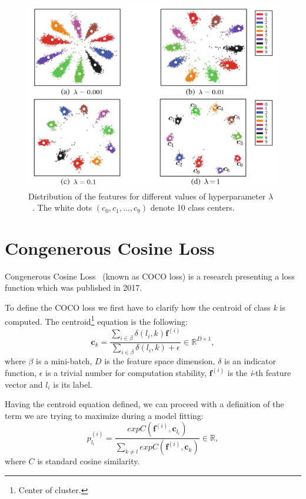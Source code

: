 \begin{figure}[H]
    \centering
    \includegraphics[width=\columnwidth]{images/face-recognition/centerlosslambda.png}
    \caption{Distribution of the features for different values of hyperparameter $\lambda$~\cite{CenterLoss}.
    The white dots $(c_0,c_1,\dots,c_9)$ denote 10 class centers.}
    \label{fig:centerlosslambda}
\end{figure}

\section{Congenerous Cosine Loss}\label{sec:coco-loss}
Congenerous Cosine Loss~\cite{CocoLoss} (known as COCO loss) is a research presenting a loss function which was
published in 2017.

To define the COCO loss we first have to clarify how the centroid of class \textit{k} is computed.
The centroid\footnote{Center of cluster.} equation is the following:
\begin{equation}
    \boldsymbol{c}_{k} = \frac{\sum_{i \in \beta} \delta \left( l_i, k \right)\boldsymbol{f}^{(i)}}
    {\sum_{i \in \beta} \delta \left( l_i, k \right) + \epsilon} \in \mathbb{R}^{D \times 1},
\end{equation}
where $\beta$ is a mini-batch, $D$ is the feature space dimension, $\delta$ is an indicator function, $\epsilon$ is a
trivial number for computation stability, $\boldsymbol{f}^{(i)}$ is the \textit{i}-th feature vector and $l_i$ is
its label.

Having the centroid equation defined, we can proceed with a definition of the term we are trying to maximize during
a model fitting:
\begin{equation}
    p_{l_i}^{(i)} = \frac{exp C(\boldsymbol{f}^{(i)}, \boldsymbol{c}_{l_{i}})}
    {\sum_{k \neq l} exp C(\boldsymbol{f}^{(i)}, \boldsymbol{c}_{k})} \in \mathbb{R},
\end{equation}
where $C$ is standard cosine similarity.

